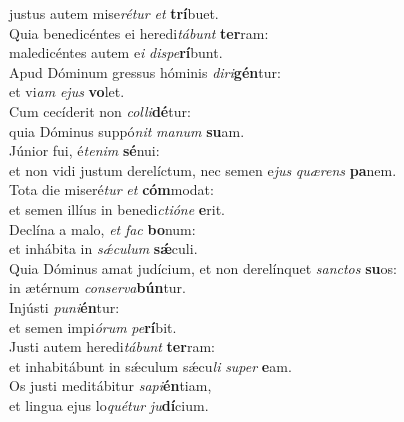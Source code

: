 \evenverse justus autem mise\textit{ré}\textit{tur} \textit{et} \textbf{trí}buet.\\
\oddverse Quia benedicéntes ei heredi\textit{tá}\textit{bunt} \textbf{ter}ram:~\*\\
\oddverse maledicéntes autem e\textit{i} \textit{di}\textit{spe}\textbf{rí}bunt.\\
\evenverse Apud Dóminum gressus hóminis \textit{di}\textit{ri}\textbf{gén}tur:~\*\\
\evenverse et vi\textit{am} \textit{e}\textit{jus} \textbf{vo}let.\\
\oddverse Cum cecíderit non \textit{col}\textit{li}\textbf{dé}tur:~\*\\
\oddverse quia Dóminus suppó\textit{nit} \textit{ma}\textit{num} \textbf{su}am.\\
\evenverse Júnior fui, é\textit{te}\textit{nim} \textbf{sé}nui:~\*\\
\evenverse et non vidi justum derelíctum, nec semen e\textit{jus} \textit{quæ}\textit{rens} \textbf{pa}nem.\\
\oddverse Tota die miseré\textit{tur} \textit{et} \textbf{cóm}modat:~\*\\
\oddverse et semen illíus in benedi\textit{cti}\textit{ó}\textit{ne} \textbf{e}rit.\\
\evenverse Declína a malo, \textit{et} \textit{fac} \textbf{bo}num:~\*\\
\evenverse et inhábita in \textit{sǽ}\textit{cu}\textit{lum} \textbf{sǽ}culi.\\
\oddverse Quia Dóminus amat judícium, et non derelínquet \textit{san}\textit{ctos} \textbf{su}os:~\*\\
\oddverse in ætérnum \textit{con}\textit{ser}\textit{va}\textbf{bún}tur.\\
\evenverse Injústi \textit{pu}\textit{ni}\textbf{én}tur:~\*\\
\evenverse et semen impi\textit{ó}\textit{rum} \textit{pe}\textbf{rí}bit.\\
\oddverse Justi autem heredi\textit{tá}\textit{bunt} \textbf{ter}ram:~\*\\
\oddverse et inhabitábunt in sǽculum sǽcu\textit{li} \textit{su}\textit{per} \textbf{e}am.\\
\evenverse Os justi meditábitur \textit{sa}\textit{pi}\textbf{én}tiam,~\*\\
\evenverse et lingua ejus lo\textit{qué}\textit{tur} \textit{ju}\textbf{dí}cium.\\
